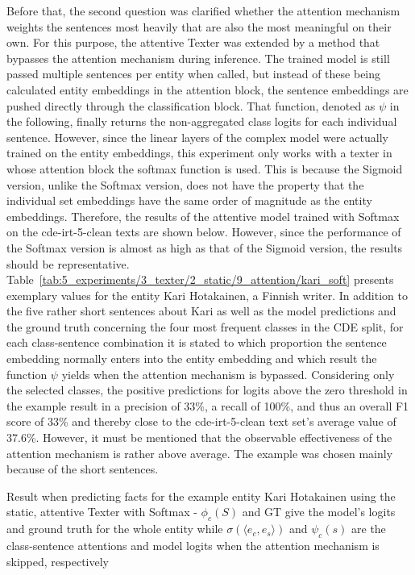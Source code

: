 Before that, the second question was clarified whether the attention mechanism weights the sentences most heavily that are also the most meaningful on their own. For this purpose, the attentive Texter was extended by a method that bypasses the attention mechanism during inference. The trained model is still passed multiple sentences per entity when called, but instead of these being calculated entity embeddings in the attention block, the sentence embeddings are pushed directly through the classification block. That function, denoted as $\psi$ in the following, finally returns the non-aggregated class logits for each individual sentence. However, since the linear layers of the complex model were actually trained on the entity embeddings, this experiment only works with a texter in whose attention block the softmax function is used. This is because the Sigmoid version, unlike the Softmax version, does not have the property that the individual set embeddings have the same order of magnitude as the entity embeddings. Therefore, the results of the attentive model trained with Softmax on the cde-irt-5-clean texts are shown below. However, since the performance of the Softmax version is almost as high as that of the Sigmoid version, the results should be representative. Table~\ref{tab:5_experiments/3_texter/2_static/9_attention/kari_soft} presents exemplary values for the entity Kari Hotakainen, a Finnish writer. In addition to the five rather short sentences about Kari as well as the model predictions and the ground truth concerning the four most frequent classes in the CDE split, for each class-sentence combination it is stated to which proportion the sentence embedding normally enters into the entity embedding and which result the function $\psi$ yields when the attention mechanism is bypassed. Considering only the selected classes, the positive predictions for logits above the zero threshold in the example result in a precision of 33\%, a recall of 100\%, and thus an overall F1 score of 33\% and thereby close to the cde-irt-5-clean text set's average value of 37.6\%. However, it must be mentioned that the observable effectiveness of the attention mechanism is rather above average. The example was chosen mainly because of the short sentences.

\begin{table}[h]
    \centering
    
    \caption{Result when predicting facts for the example entity Kari Hotakainen using the static, attentive Texter with Softmax - $\phi_c(S)$ and GT give the model's logits and ground truth for the whole entity while $\sigma(\langle e_c, e_s \rangle)$ and $\psi_c(s)$ are the class-sentence attentions and model logits when the attention mechanism is skipped, respectively}
    \label{tab:5_experiments/3_texter/2_static/9_attention/kari_soft}
\end{table}

